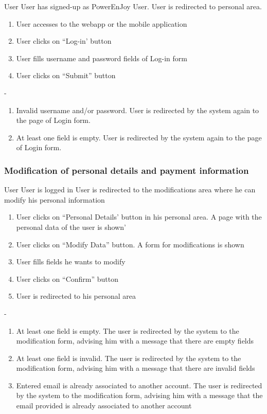 {User}
{}
{User has signed-up as PowerEnJoy User.}
{User is redirected to personal area.}
{
	\begin{enumerate}
		\item User accesses to the webapp or the mobile application
		\item User clicks on ``Log-in' button
		\item User fills username and password fields of Log-in form
		\item User clicks on ``Submit'' button
	\end{enumerate}
}
{-}
{
	\begin{enumerate}
		\item Invalid username and/or password. User is redirected by the system again to the page of Login form.
		\item At least one field is empty. User is redirected by the system again to the page of Login form.
	\end{enumerate}
}

\pagebreak


\subsubsection{Modification of personal details and payment information}
{User}
{}
{User is logged in}
{User is redirected to the modifications area where he can modify his personal information}
{
\begin{enumerate}
	\item User clicks on ``Personal Details' button in his personal area. A page with the personal data of the user is shown'
	\item User clicks on ``Modify Data'' button. A form for modifications is shown
	\item User fills fields he wants to modify
	\item User clicks on ``Confirm'' button
	\item User is redirected to his personal area
\end{enumerate}
}
{-}
{
	\begin{enumerate}
		\item At least one field is empty. The user is redirected by the system to the modification form, advising him with a message that there are empty fields
		\item At least one field is invalid. The user is redirected by the system to the modification form, advising him with a message	that there are invalid fields
                      \item Entered email is already associated to another account. The user is redirected by the system to the modification form, advising him with a message that the email provided is already associated to another account
                    
	\end{enumerate}
	}
\pagebreak


